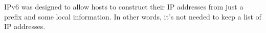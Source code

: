 IPv6 was designed to allow hosts to construct their IP addresses from just a prefix and some local information. In other words, it's not needed to keep a list of IP addresses.